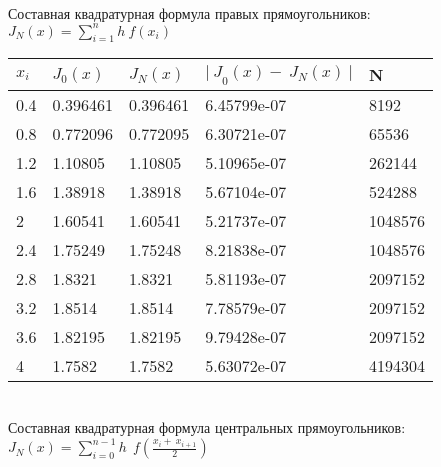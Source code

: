 \documentclass[12pt,a4paper]{report}
\begin{document}
{	\vspace*{1.5cm}
	\noindent \\Составная квадратурная формула правых прямоугольников:
	\newline
	$J_N\left(x\right)=\displaystyle\sum_{i=1}^{n}h\ f(x_i)$\\
	
	\begin{center}
		\begin{tabular}{ | l | l | l | l | l | }
			\hline
			$x_i$	& $J_0(x)$	& $J_N(x)$	& ${|\ J}_0\left(x\right)-\ J_N\left(x\right)\ |$	& N \\
			\hline
			0.4     & 0.396461  & 0.396461  & 6.45799e-07                                       & 8192\\
			\hline
			0.8     & 0.772096  & 0.772095  & 6.30721e-07                                       & 65536\\
			\hline
			1.2     & 1.10805   & 1.10805   & 5.10965e-07                                       & 262144\\
			\hline
			1.6     & 1.38918   & 1.38918   & 5.67104e-07                                       & 524288\\
			\hline
			2       & 1.60541   & 1.60541   & 5.21737e-07                                       & 1048576\\
			\hline
			2.4     & 1.75249   & 1.75248   & 8.21838e-07                                       & 1048576\\
			\hline
			2.8     & 1.8321    & 1.8321    & 5.81193e-07                                       & 2097152\\
			\hline
			3.2     & 1.8514    & 1.8514    & 7.78579e-07                                       & 2097152\\
			\hline
			3.6     & 1.82195   & 1.82195   & 9.79428e-07                                       & 2097152\\
			\hline
			4       & 1.7582    & 1.7582    & 5.63072e-07                                       & 4194304\\
			\hline
		\end{tabular}
	\end{center}
	
	\noindent \\Составная квадратурная формула центральных прямоугольников:
	\newline
	 $J_N\displaystyle\left(x\right)=\sum_{i=0}^{n-1}h\ \ f\left(\frac{x_i+\ x_{i+1}}{2}\right)$ \\
	
}
\end{document}
